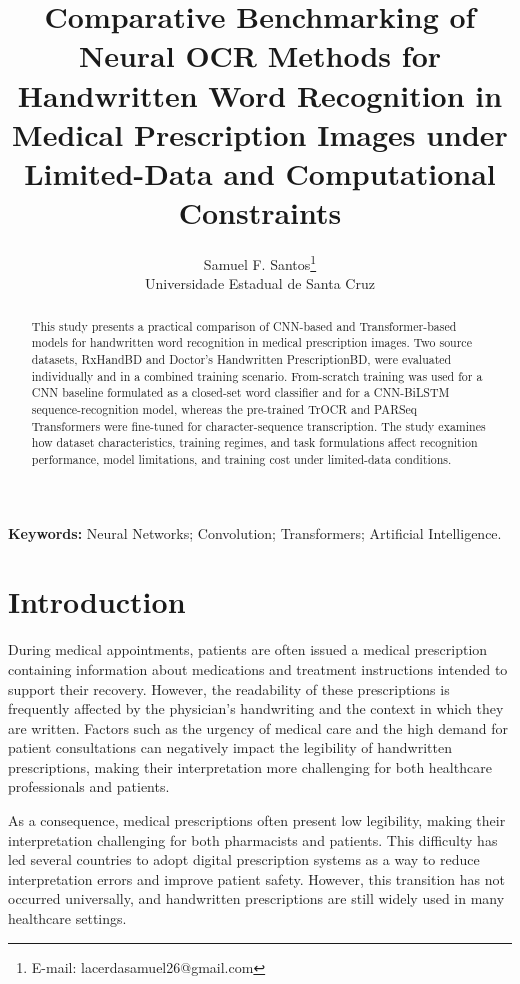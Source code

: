 \documentclass[11pt,a4paper]{article}
\title{Comparative Benchmarking of Neural OCR Methods for Handwritten Word Recognition in Medical Prescription Images under Limited-Data and Computational Constraints}
\author{
  Samuel F. Santos\thanks{E-mail: lacerdasamuel26@gmail.com}
  \\ Universidade Estadual de Santa Cruz
}
\date{}
\begin{document}
\maketitle

\begin{abstract}

This study presents a practical comparison of CNN-based and Transformer-based models for handwritten word recognition in medical prescription images. Two source datasets, RxHandBD and Doctor's Handwritten PrescriptionBD, were evaluated individually and in a combined training scenario. From-scratch training was used for a CNN baseline formulated as a closed-set word classifier and for a CNN-BiLSTM sequence-recognition model, whereas the pre-trained TrOCR and PARSeq Transformers were fine-tuned for character-sequence transcription. The study examines how dataset characteristics, training regimes, and task formulations affect recognition performance, model limitations, and training cost under limited-data conditions.
\end{abstract}

\noindent\textbf{Keywords:} Neural Networks; Convolution; Transformers; Artificial Intelligence.

\section{Introduction}
\label{sec:introduction}





During medical appointments, patients are often issued a medical prescription containing information about medications and treatment instructions intended to support their recovery. However, the readability of these prescriptions is frequently affected by the physician's handwriting and the context in which they are written. Factors such as the urgency of medical care and the high demand for patient consultations can negatively impact the legibility of handwritten prescriptions, making their interpretation more challenging for both healthcare professionals and patients.

As a consequence, medical prescriptions often present low legibility, making their interpretation challenging for both pharmacists and patients. This difficulty has led several countries to adopt digital prescription systems as a way to reduce interpretation errors and improve patient safety. However, this transition has not occurred universally, and handwritten prescriptions are still widely used in many healthcare settings.
\end{document}

